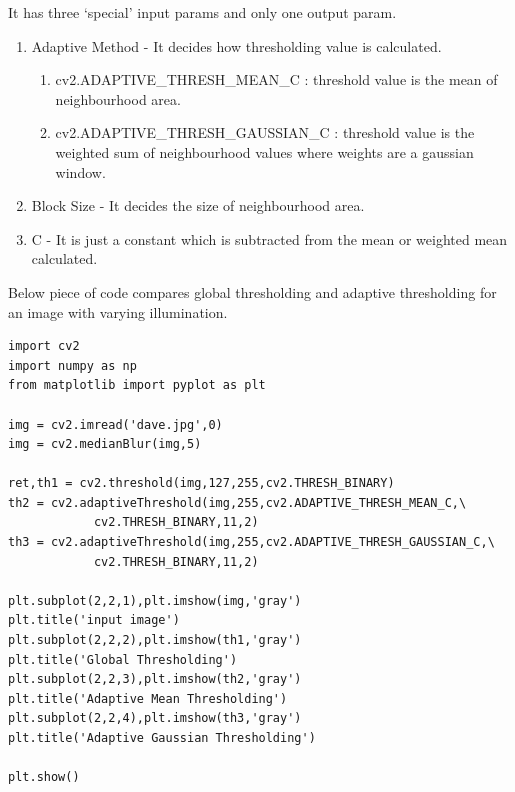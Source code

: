 \documentclass[a4paper,11pt]{book}
\begin{document}
It has three `special' input params and only one output param.
\begin{enumerate}
	\item Adaptive Method - It decides how thresholding value is calculated.
	\begin{enumerate}
	\item cv2.ADAPTIVE\_THRESH\_MEAN\_C : threshold value is the mean of neighbourhood area.
	\item cv2.ADAPTIVE\_THRESH\_GAUSSIAN\_C : threshold value is the weighted sum of neighbourhood values where weights are a gaussian window.
    \end{enumerate}
    
    \item Block Size - It decides the size of neighbourhood area.
    \item C - It is just a constant which is subtracted from the mean or weighted mean calculated.
\end{enumerate}

Below piece of code compares global thresholding and adaptive thresholding for an image with varying illumination.

\bigskip
\begin{lstlisting}
import cv2
import numpy as np
from matplotlib import pyplot as plt

img = cv2.imread('dave.jpg',0)
img = cv2.medianBlur(img,5)

ret,th1 = cv2.threshold(img,127,255,cv2.THRESH_BINARY)
th2 = cv2.adaptiveThreshold(img,255,cv2.ADAPTIVE_THRESH_MEAN_C,\
            cv2.THRESH_BINARY,11,2)
th3 = cv2.adaptiveThreshold(img,255,cv2.ADAPTIVE_THRESH_GAUSSIAN_C,\
            cv2.THRESH_BINARY,11,2)

plt.subplot(2,2,1),plt.imshow(img,'gray')
plt.title('input image')
plt.subplot(2,2,2),plt.imshow(th1,'gray')
plt.title('Global Thresholding')
plt.subplot(2,2,3),plt.imshow(th2,'gray')
plt.title('Adaptive Mean Thresholding')
plt.subplot(2,2,4),plt.imshow(th3,'gray')
plt.title('Adaptive Gaussian Thresholding')

plt.show()
\end{lstlisting}
\bigskip
\end{document}

